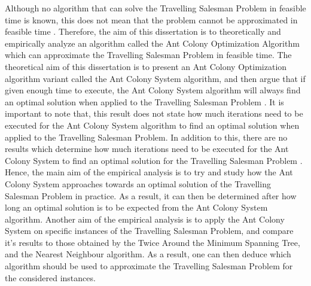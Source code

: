 \documentclass[12pt]{article}
\numberwithin{equation}{subsection}
\numberwithin{table}{subsection}
\numberwithin{algorithm}{subsection}
\numberwithin{figure}{subsection}
\begin{document}
Although no algorithm that can solve the Travelling Salesman Problem in feasible time is known, this does not mean that the problem cannot be approximated in feasible time \cite{cormen_leiserson_rivest_stein}. Therefore, the aim of this dissertation is to theoretically and empirically analyze an algorithm called the Ant Colony Optimization Algorithm which can approximate the Travelling Salesman Problem in feasible time. The theoretical aim of this dissertation is to present an Ant Colony Optimization algorithm variant called the Ant Colony System algorithm, and then argue that if given enough time to execute, the Ant Colony System algorithm will always find an optimal solution when applied to the Travelling Salesman Problem \cite{dorigo_stutzle_thomas_2004}. It is important to note that, this result does not state how much iterations need to be executed for the  Ant Colony System algorithm to find an optimal solution when applied to the Travelling Salesman Problem. In addition to this, there are no results which determine how much iterations need to be executed for the Ant Colony System to find an optimal solution for the Travelling Salesman Problem \cite{dorigo_stutzle_thomas_2004}. Hence, the main aim of the empirical analysis is to try and study how the Ant Colony System approaches towards an optimal solution of the Travelling Salesman Problem in practice. As a result, it can then be determined after how long an optimal solution is to be expected from the Ant Colony System algorithm. Another aim of the empirical analysis is to apply the Ant Colony System on specific instances of the Travelling Salesman Problem, and compare it's results to those obtained by the Twice Around the Minimum Spanning Tree, and the Nearest Neighbour algorithm. As a result, one can then deduce which algorithm should be used to approximate the Travelling Salesman Problem for the considered instances. \\\\
\end{document}
